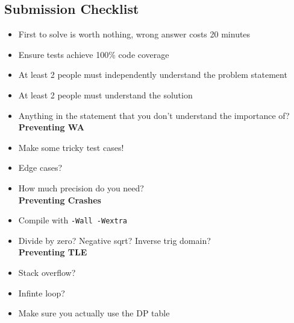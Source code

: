 \documentclass[landscape]{article}
\begin{document}
\begin{multicols*}{2}
\subsection{Submission Checklist}
\begin{itemize}
    \setlength\itemsep{-0.5em}
    \item First to solve is worth nothing, wrong answer costs 20 minutes
    \item Ensure tests achieve 100\% code coverage
    \item At least 2 people must independently understand the problem statement
    \item At least 2 people must understand the solution
    \item Anything in the statement that you don't understand the importance of?
    \\\textbf{Preventing WA}
    \item Make some tricky test cases!
    \item Edge cases?
    \item How much precision do you need?
    \\\textbf{Preventing Crashes}
    \item Compile with \texttt{-Wall -Wextra}
    \item Divide by zero? Negative sqrt? Inverse trig domain?
    \\\textbf{Preventing TLE}
    \item Stack overflow?
    \item Infinte loop?
    \item Make sure you actually use the DP table
\end{itemize}


\end{multicols*}
\end{document}
